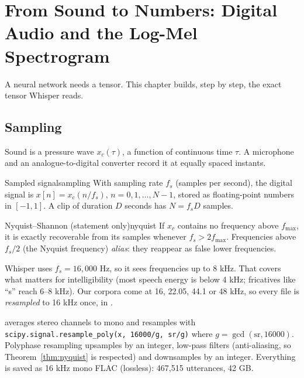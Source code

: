\chapter{From Sound to Numbers: Digital Audio and the Log-Mel Spectrogram}
\label{ch:audio}

A neural network needs a tensor. This chapter builds, step by step, the exact tensor Whisper reads.

\section{Sampling}

Sound is a pressure wave $x_c(\tau)$, a function of continuous time $\tau$. A microphone and an analogue-to-digital converter
record it at equally spaced instants.

\begin{definition}{Sampled signal}{sampling}
With sampling rate $f_s$ (samples per second), the digital signal is $x[n]=x_c(n/f_s)$, $n=0,1,\dots,N-1$, stored as
floating-point numbers in $[-1,1]$. A clip of duration $D$ seconds has $N=f_sD$ samples.
\end{definition}

\begin{theorem}{Nyquist--Shannon (statement only)}{nyquist}
If $x_c$ contains no frequency above $f_{\max}$, it is exactly recoverable from its samples whenever $f_s>2f_{\max}$. Frequencies
above $f_s/2$ (the Nyquist frequency) \emph{alias}: they reappear as false lower frequencies.
\end{theorem}

Whisper uses $f_s=16{,}000$ Hz, so it sees frequencies up to 8 kHz. That covers what matters for intelligibility (most speech
energy is below 4 kHz; fricatives like ``s'' reach 6--8 kHz). Our corpora come at 16, 22.05, 44.1 or 48 kHz, so every file is
\emph{resampled} to 16 kHz once, in .

\begin{incode}
 averages stereo channels to mono and resamples with \texttt{scipy.signal.resample\_poly(x, 16000/g,
sr/g)} where $g=\gcd(\text{sr},16000)$. Polyphase resampling upsamples by an integer, low-pass filters (anti-aliasing, so
Theorem~\ref{thm:nyquist} is respected) and downsamples by an integer. Everything is saved as 16 kHz mono FLAC (lossless): 467{,}515
utterances, 42 GB.
\end{incode}


